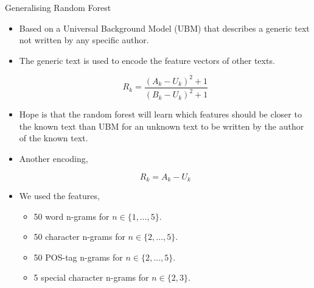 \documentclass[10pt]{beamer}
\begin{document}
\begin{frame}[fragile]{Generalising Random Forest}

    \begin{itemize}
        \item Based on a Universal Background Model (UBM) that describes a
            generic text not written by any specific author.
        \item The generic text is used to encode the feature vectors of other
            texts.

            \begin{equation}
                R_k = \frac{(A_k - U_k)^2 + 1}{(B_k - U_k)^2 + 1}
            \end{equation}
        \item Hope is that the random forest will learn which features should be
            closer to the known text than UBM for an unknown text to be written
            by the author of the known text.
        \item Another encoding,

            \begin{equation}
                R_k = A_k - U_k
            \end{equation}
        \item We used the features,
            \begin{itemize}
                \item 50 word n-grams for $n \in \{1, \dots, 5\}$.
                \item 50 character n-grams for $n \in \{2, \dots, 5\}$.
                \item 50 POS-tag n-grams for $n \in \{2, \dots, 5\}$.
                \item 5 special character n-grams for $n \in \{2, 3\}$.
            \end{itemize}
    \end{itemize}

\end{frame}
\end{document}
